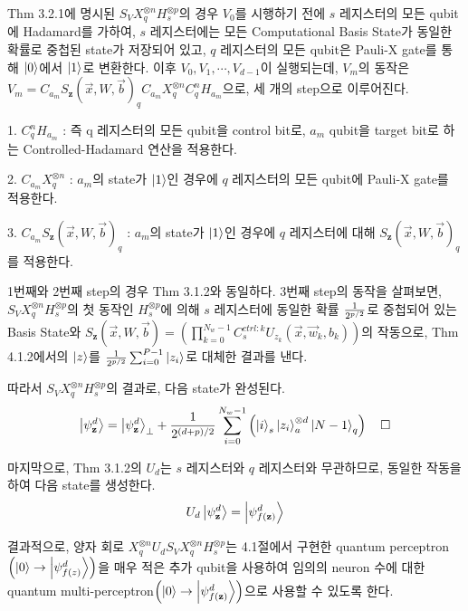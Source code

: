 \begin{pf}

Thm 3.2.1에 명시된 \(S_V X_q^{\otimes n} H_s^{\otimes p}\)의 경우 $V_0$를 시행하기 전에 \(s\) 레지스터의 모든 qubit에 Hadamard를 가하여, \(s\) 레지스터에는 모든 Computational Basis State가 동일한 확률로 중첩된 state가 저장되어 있고, \(q\) 레지스터의 모든 qubit은 Pauli-X gate를 통해 \(\ket 0\)에서 \(\ket 1\)로 변환한다. 이후 \(V_0, V_1, \cdots, V_{d-1}\)이 실행되는데, $V_m$의 동작은 \(V_m = C_{a_m}S_{\mathbf{z}}(\vec{x}, W, \vec{b})_q C_{a_m}X^{\otimes n}_q C_q^nH_{a_m}\)으로, 세 개의 step으로 이루어진다.

1. \(C_q^nH_{a_m}\) : 즉 q 레지스터의 모든 qubit을 control bit로, \(a_m\) qubit을 target bit로 하는 Controlled-Hadamard 연산을 적용한다.

2. \(C_{a_m}X^{\otimes n}_q\) : \(a_m\)의 state가 \(\ket 1\)인 경우에 \(q\) 레지스터의 모든 qubit에 Pauli-X gate를 적용한다.

3. \(C_{a_m}S_{\mathbf{z}}(\vec{x}, W, \vec{b})_q\) : \(a_m\)의 state가 \(\ket 1\)인 경우에 \(q\) 레지스터에 대해 \(S_{\mathbf{z}}(\vec{x}, W, \vec{b})_q\)를 적용한다.

1번째와 2번째 step의 경우 Thm 3.1.2와 동일하다. 3번째 step의 동작을 살펴보면, \(S_V X_q^{\otimes n} H_s^{\otimes p}\)의 첫 동작인 \(H_s^{\otimes p}\)에 의해 \(s\) 레지스터에 동일한 확률 \(1 \over {2^{p/2}}\)로 중첩되어 있는 Basis State와 \(S_{\mathbf z}(\vec{x}, W, \vec{b})= \left(\prod_{k=0}^{N_w-1}C_{s}^{ctrl : k}U_{z_k}(\vec{x}, \vec{w}_k, b_k)\right)\)의 작동으로, Thm 4.1.2에서의 \(\ket{z}\)를 \({1\over {2^{p/2}}}\sum_{i=0}^{P-1} \ket{z_i}\)로 대체한 결과를 낸다.

따라서 \(S_V X_q^{\otimes n} H_s^{\otimes p}\)의 결과로, 다음 state가 완성된다.
\[
    \ket{\psi_{\mathbf z}^d} = \ket{\psi_{\mathbf z}^d}_{\perp} + {1 \over {2^{(d + p) / 2}}}\sum_{i=0}^{N_w - 1}\left( \ket{i}_{s} \ket{z_i}_{a}^{\otimes d} \ket{N-1}_q \right) \quad \square
\]
\end{pf}

마지막으로, Thm 3.1.2의 $U_d$는 \(s\) 레지스터와 \(q\) 레지스터와 무관하므로, 동일한 작동을 하여 다음 state를 생성한다.
\[
    U_d \ket{\psi_{\mathbf z}^d} = \ket{\psi_{f(\mathbf z)}^d}
\]

결과적으로, 양자 회로 \(X_q^{\otimes n} U_d S_V X_q^{\otimes n} H_s^{\otimes p}\)는 4.1절에서 구현한 quantum perceptron\(\left(\ket{0} \rightarrow \ket{\psi_{ f(z)}^d}\right)\)을 매우 적은 추가 qubit을 사용하여 임의의 neuron 수에 대한 quantum multi-perceptron\(\left(\ket{0} \rightarrow \ket{\psi_{f(\mathbf z)}^d}\right)\)으로 사용할 수 있도록 한다.


